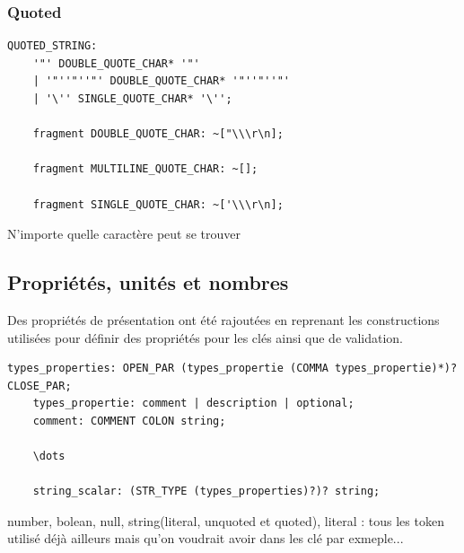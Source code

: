 \documentclass[
    iict, %
    il, %
]{heig-tb}
\begin{document}

\subsubsection{Quoted}

\begin{lstlisting}[frame=single,caption={Règle concernant les strings avec guillement},label={quoted}]
    QUOTED_STRING:
    '"' DOUBLE_QUOTE_CHAR* '"'
    | '"''"''"' DOUBLE_QUOTE_CHAR* '"''"''"'
    | '\'' SINGLE_QUOTE_CHAR* '\'';

    fragment DOUBLE_QUOTE_CHAR: ~["\\\r\n];

    fragment MULTILINE_QUOTE_CHAR: ~[];

    fragment SINGLE_QUOTE_CHAR: ~['\\\r\n];
\end{lstlisting}

N'importe quelle caractère peut se trouver


\subsection{Propriétés, unités et nombres}

Des propriétés de présentation ont été rajoutées en reprenant les constructions utilisées pour définir des propriétés pour les clés ainsi que de validation.

\begin{lstlisting}[frame=single,caption={Règle concernant les propriétés de présentation des types},label={types_properties}]
    types_properties: OPEN_PAR (types_propertie (COMMA types_propertie)*)? CLOSE_PAR;
    types_propertie: comment | description | optional;
    comment: COMMENT COLON string;

    \dots

    string_scalar: (STR_TYPE (types_properties)?)? string;
\end{lstlisting}

number, bolean, null, string(literal, unquoted et quoted),
literal : tous les token utilisé déjà ailleurs mais qu'on voudrait avoir dans les clé par exmeple...
\end{document}
